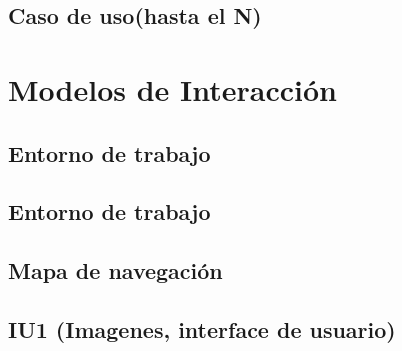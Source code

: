 \documentclass[a4paper]{article}
\begin{document}
		\subsection{Caso de uso(hasta el N)}
	\section{Modelos de Interacción}
		\subsection{Entorno de trabajo}
		\subsection{Entorno de trabajo}
		\subsection{Mapa de navegación}
		\subsection{IU1 (Imagenes, interface de usuario)}
\end{document}
